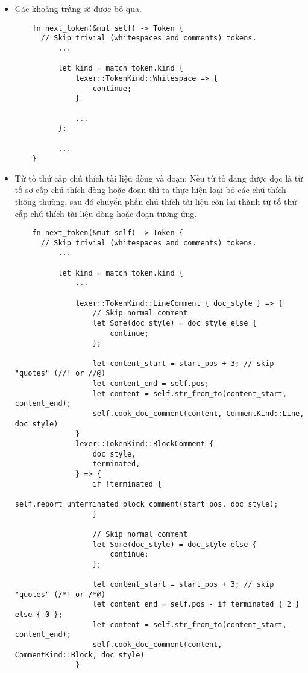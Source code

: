 \begin{itemize}
  \item Các khoảng trắng sẽ được bỏ qua.
  \begin{lstlisting}
    fn next_token(&mut self) -> Token {
      // Skip trivial (whitespaces and comments) tokens.
          ...
  
          let kind = match token.kind {
              lexer::TokenKind::Whitespace => {
                  continue;
              }
              
              ...
          };
  
          ...
    }
  \end{lstlisting}
  \item Từ tố thứ cấp chú thích tài liệu dòng và đoạn: Nếu từ tố đang được đọc là từ tố sơ cấp chú thích dòng hoặc đoạn thì ta thực hiện loại bỏ các chú thích thông thường, sau đó chuyển phần chú thích tài liệu còn lại thành từ tố thứ cấp chú thích tài liệu dòng hoặc đoạn tương ứng.
  \begin{lstlisting}
    fn next_token(&mut self) -> Token {
      // Skip trivial (whitespaces and comments) tokens.
          ...
  
          let kind = match token.kind {
              ...

              lexer::TokenKind::LineComment { doc_style } => {
                  // Skip normal comment
                  let Some(doc_style) = doc_style else {
                      continue;
                  };
  
                  let content_start = start_pos + 3; // skip "quotes" (//! or //@)
                  let content_end = self.pos;
                  let content = self.str_from_to(content_start, content_end);
                  self.cook_doc_comment(content, CommentKind::Line, doc_style)
              }
              lexer::TokenKind::BlockComment {
                  doc_style,
                  terminated,
              } => {
                  if !terminated {
                      self.report_unterminated_block_comment(start_pos, doc_style);
                  }
  
                  // Skip normal comment
                  let Some(doc_style) = doc_style else {
                      continue;
                  };
  
                  let content_start = start_pos + 3; // skip "quotes" (/*! or /*@)
                  let content_end = self.pos - if terminated { 2 } else { 0 };
                  let content = self.str_from_to(content_start, content_end);
                  self.cook_doc_comment(content, CommentKind::Block, doc_style)
              }
              

\end{lstlisting}
\end{itemize}
